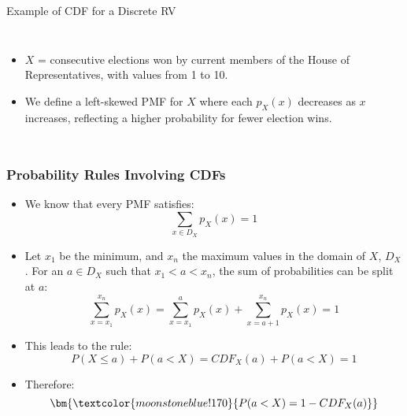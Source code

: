 \documentclass[handout]{beamer} %
\begin{document}
\begin{frame}{Example of CDF for a Discrete RV}

\begin{columns}

\footnotesize
\begin{itemize}
  \item \(X\) =  consecutive elections won by current members of the House of Representatives, with values from 1 to 10.
  \pause
  \item We define a left-skewed PMF for \(X\) where each \(p_X(x)\) decreases as \(x\) increases, reflecting a higher probability for fewer election wins.
  \pause
\end{itemize}


\end{columns}

\end{frame}

\begin{frame}
\frametitle{Probability Rules Involving CDFs}
\small
\begin{itemize}
  \setlength{\itemsep}{-10pt} %
  \item We know that every PMF satisfies:
  \[
  \sum_{x \in D_X } p_X(x) = 1
  \]
  \pause
  \item Let $x_1$ be the minimum, and $x_n$ the maximum values in the domain of $X$, $D_X$. For an $a\in D_X$ such that $x_1 < a < x_n$, the sum of probabilities can be split at $a$:
  \[
  \sum_{x=x_1}^{x_n} p_X(x) = \sum_{x=x_1}^{a} p_X(x) + \sum_{x=a+1}^{x_n} p_X(x) = 1
  \]
  \pause
  \item This leads to the rule:
  \[
  P(X \leq a) + P(a < X) = CDF_X(a) + P(a < X) = 1
  \]
  \pause
  \item Therefore:
  \[
  \bm{ \textcolor{moonstoneblue!170}{P(a< X) = 1 - CDF_X(a)}}
  \]
\end{itemize}

\end{frame}
\end{document}
